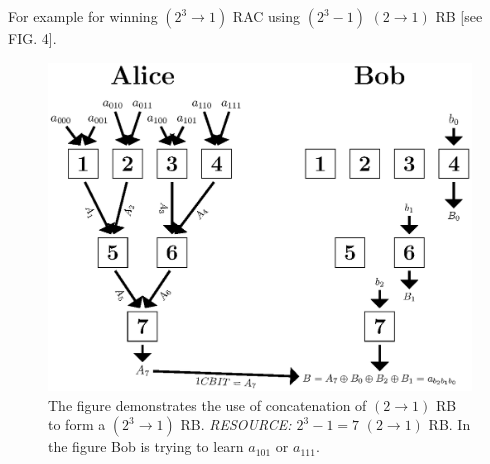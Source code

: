 For example for winning $(2^{3}\rightarrow 1)$ RAC using $(2^{3}-1)$ $(2\rightarrow 1)$ RB [see FIG. 4].
\begin{figure} 
\includegraphics[scale=0.6]{1.eps}
\caption{  The figure demonstrates the use of concatenation of $(2\rightarrow1)$ RB
to form a $(2^{3}\rightarrow 1)$ RB. \textit{RESOURCE: $2^{3}-1=7$ }$(2\rightarrow 1)$
RB. In the figure Bob is trying to learn $a_{101}$ or $a_{111}$.}
\end{figure}
